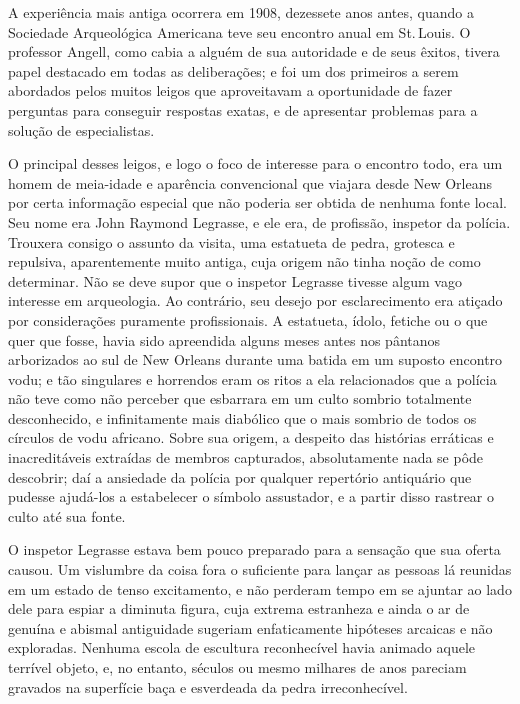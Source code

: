 A experiência mais antiga ocorrera em 1908, dezessete anos antes, quando
a Sociedade Arqueológica Americana teve seu encontro anual em St.\,Louis.
O professor Angell, como cabia a alguém de sua autoridade e de seus
êxitos, tivera papel destacado em todas as deliberações; e foi um dos
primeiros a serem abordados pelos muitos leigos que aproveitavam a
oportunidade de fazer perguntas para conseguir respostas exatas, e de
apresentar problemas para a solução de especialistas.

O principal desses leigos, e logo o foco de interesse para o encontro
todo, era um homem de meia-idade e aparência convencional que viajara
desde New Orleans por certa informação especial que não poderia ser
obtida de nenhuma fonte local. Seu nome era John Raymond Legrasse, e ele
era, de profissão, inspetor da polícia. Trouxera consigo o assunto da visita, 
uma estatueta de pedra, grotesca e repulsiva, aparentemente
muito antiga, cuja origem não tinha noção de como determinar. Não se
deve supor que o inspetor Legrasse tivesse algum vago interesse
em arqueologia. Ao contrário, seu desejo por esclarecimento era atiçado
por considerações puramente profissionais. A estatueta, ídolo, fetiche
ou o que quer que fosse, havia sido apreendida alguns meses antes nos
pântanos arborizados ao sul de New Orleans durante uma batida em um
suposto encontro vodu; e tão singulares e horrendos eram os ritos
a ela relacionados que a polícia não teve como não perceber que esbarrara em
um culto sombrio totalmente desconhecido, e infinitamente mais diabólico
que o mais sombrio de todos os círculos de vodu africano. Sobre
sua origem, a despeito das histórias erráticas e inacreditáveis
extraídas de membros capturados, absolutamente nada se pôde descobrir;
daí a ansiedade da polícia por qualquer repertório antiquário que
pudesse ajudá-los a estabelecer o símbolo assustador, e a partir disso
rastrear o culto até sua fonte.

O inspetor Legrasse estava bem pouco preparado para a sensação que sua
oferta causou. Um vislumbre da coisa fora o suficiente para lançar as
pessoas lá reunidas em um estado de tenso excitamento, e não perderam
tempo em se ajuntar ao lado dele para espiar a diminuta figura, cuja
extrema estranheza e ainda o ar de genuína e abismal antiguidade
sugeriam enfaticamente hipóteses arcaicas e não exploradas. Nenhuma
escola de escultura reconhecível havia animado aquele terrível objeto, e,
no entanto, séculos ou mesmo milhares de anos pareciam gravados na
superfície baça e esverdeada da pedra irreconhecível.

